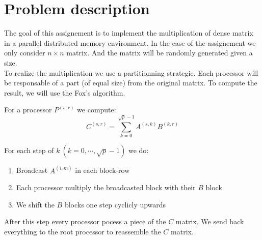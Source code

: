\chapter{Problem description}

The goal of this assignement is to implement the multiplication of dense matrix in a parallel distributed memory environment. In the case of the assignement we only consider $n\times n$ matrix. And the matrix will be randomly generated given a size.\\

To realize the multiplication we use a partitionning strategie. Each processor will be responsable of a part (of equal size) from the original matrix. To compute the result, we will use the Fox's algorithm.

For a processor $P^{(s,r)}$ we compute:
\[C^{(s,r)} = \sum^{\sqrt{p}-1}_{k=0}A^{(s,k)}B^{(k,r)}\]

For each step of $k\ (k=0,\cdots,\sqrt{p}-1)$ we do:
\begin{enumerate}[1. ]
  \item Broadcast $A^{(i,m)}$ in each block-row
  \item Each processor multiply the broadcasted block with their $B$ block
  \item We shift the $B$ blocks one step cyclicly upwards
\end{enumerate}

After this step every processor pocess a piece of the $C$ matrix. We send back everything to the root processor to reassemble the $C$ matrix.
